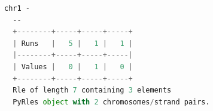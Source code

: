 \documentclass[10pt,letterpaper]{article}
\begin{document}
\begin{adjustwidth}{-2in}{0in}
\begin{flushright}
\begin{lstlisting}[language=Python, linewidth=30cm, basicstyle=\small]
  chr1 -
  --
  +--------+-----+-----+-----+
  | Runs   |   5 |   1 |   1 |
  |--------+-----+-----+-----|
  | Values |   0 |   1 |   0 |
  +--------+-----+-----+-----+
  Rle of length 7 containing 3 elements
  PyRles object with 2 chromosomes/strand pairs.

\end{lstlisting}
\end{flushright}

\end{adjustwidth}






\end{document}
